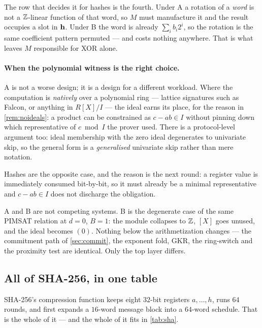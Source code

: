 The row that decides it for hashes is the fourth. Under A a rotation of a
\emph{word} is not a $\mathbb{Z}$-linear function of that word, so $M$ must manufacture
it and the result occupies a slot in $\mathbf{h}$. Under B the word is already
$\sum_i b_i2^i$, so the rotation is the same coefficient pattern permuted --- and
costs nothing anywhere. That is what leaves $M$ responsible for XOR alone.

\paragraph{When the polynomial witness is the right choice.}
A is not a worse design; it is a design for a different workload. Where the
computation is \emph{natively} over a polynomial ring --- lattice signatures such
as Falcon, or anything in $R[X]/I$ --- the ideal earns its place, for the reason
in \cref{rem:noideals}: a product can be constrained as $c-ab\in I$ without
pinning down which representative of $c \bmod I$ the prover used. There is a
protocol-level argument too: ideal membership with the zero ideal degenerates to
univariate skip, so the general form is a \emph{generalised} univariate skip
rather than mere notation.

Hashes are the opposite case, and the reason is the next round: a register value
is immediately consumed bit-by-bit, so it must already be a minimal
representative and $c-ab\in I$ does not discharge the obligation.

\begin{remark}\label{rem:oneinstance}
A and B are not competing systems. B is the degenerate case of the same
\textsc{PIMSAT} relation at $d=0$, $B=1$: the module collapses to $\mathbb{Z}$, $[X]$
goes unused, and the ideal becomes $(0)$. Nothing below the arithmetization
changes --- the commitment path of \cref{sec:commit}, the exponent fold, GKR, the
ring-switch and the proximity test are identical. Only the top layer differs.
\end{remark}

\subsection{All of SHA-256, in one table}\label{sec:shaspec}

SHA-256's compression function keeps eight $32$-bit registers $a,\dots,h$, runs
$64$ rounds, and first expands a $16$-word message block into a $64$-word
schedule. That is the whole of it --- and the whole of it fits in
\cref{tab:sha}.

